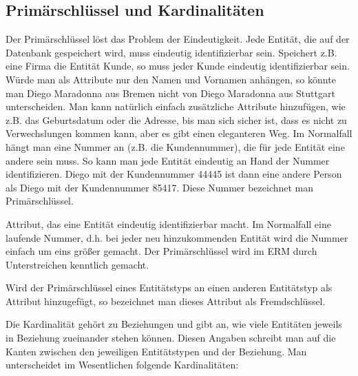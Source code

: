\subsection{Primärschlüssel und Kardinalitäten}
Der Primärschlüssel löst das Problem der Eindeutigkeit. Jede Entität, die auf der Datenbank gespeichert wird, muss eindeutig identifizierbar sein. Speichert z.B. eine Firma die Entität Kunde, so muss jeder Kunde eindeutig identifizierbar sein. Würde man als Attribute nur den Namen und Vornamen anhängen, so könnte man Diego Maradonna aus Bremen nicht von Diego Maradonna aus Stuttgart unterscheiden. Man kann natürlich einfach zusätzliche Attribute hinzufügen, wie z.B. das Geburtsdatum oder die Adresse, bis man sich sicher ist, dass es nicht zu Verwechslungen kommen kann, aber es gibt einen eleganteren Weg. Im Normalfall hängt man eine Nummer an (z.B. die Kundennummer), die für jede Entität eine andere sein muss. So kann man jede Entität eindeutig an Hand der Nummer identifizieren. Diego mit der Kundennummer 44445 ist dann eine andere Person als Diego mit der Kundennummer 85417. Diese Nummer bezeichnet man Primärschlüssel.
\begin{tcolorbox}[title=Primärschlüssel]
	Attribut, das eine Entität eindeutig identifizierbar macht. Im Normalfall eine laufende Nummer, d.h. bei jeder neu hinzukommenden Entität wird die Nummer einfach um eins größer gemacht. Der Primärschlüssel wird im ERM durch Unterstreichen kenntlich gemacht.
\end{tcolorbox}
\begin{tcolorbox}[title=Fremdschlüssel]
	Wird der Primärschlüssel eines Entitätstyps an einen anderen Entitätstyp als Attribut hinzugefügt, so bezeichnet man dieses Attribut als Fremdschlüssel.
\end{tcolorbox}
Die Kardinalität gehört zu Beziehungen und gibt an, wie viele Entitäten jeweils in Beziehung zueinander stehen können. Diesen Angaben schreibt man auf die Kanten zwischen den jeweiligen Entitätstypen und der Beziehung. Man unterscheidet im Wesentlichen folgende Kardinalitäten:

